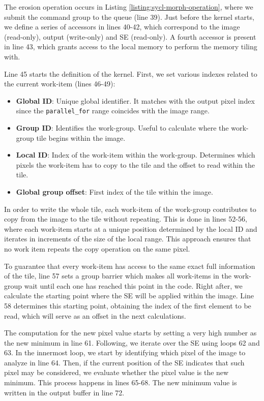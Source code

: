The erosion operation occurs in Listing \ref{listing:sycl-morph-operation}, where we submit the command group to the queue (line 39).
Just before the kernel starts, we define a series of accessors in lines 40-42, which correspond to the image (read-only), output (write-only) and SE (read-only).
A fourth accessor is present in line 43, which grants access to the local memory to perform the memory tiling with.

Line 45 starts the definition of the kernel.
First, we set various indexes related to the current work-item (lines 46-49):
\begin{itemize}
    \item \textbf{Global ID}: Unique global identifier.
    It matches with the output pixel index since the \texttt{parallel\_for} range coincides with the image range.
    \item \textbf{Group ID}: Identifies the work-group.
    Useful to calculate where the work-group tile begins within the image.
    \item \textbf{Local ID}: Index of the work-item within the work-group.
    Determines which pixels the work-item has to copy to the tile and the offset to read within the tile.
    \item \textbf{Global group offset}: First index of the tile within the image.
\end{itemize}

In order to write the whole tile, each work-item of the work-group contributes to copy from the image to the tile without repeating.
This is done in lines 52-56, where each work-item starts at a unique position determined by the local ID and iterates in increments of the size of the local range.
This approach ensures that no work item repeats the copy operation on the same pixel.

To guarantee that every work-item has access to the same exact full information of the tile, line 57 sets a group barrier which makes all work-items in the work-group wait until each one has reached this point in the code.
Right after, we calculate the starting point where the SE will be applied within the image.
Line 58 determines this starting point, obtaining the index of the first element to be read, which will serve as an offset in the next calculations.

The computation for the new pixel value starts by setting a very high number as the new minimum in line 61.
Following, we iterate over the SE using loops 62 and 63.
In the innermost loop, we start by identifying which pixel of the image to analyze in line 64.
Then, if the current position of the SE indicates that such pixel may be considered, we evaluate whether the pixel value is the new minimum.
This process happens in lines 65-68.
The new minimum value is written in the output buffer in line 72.

